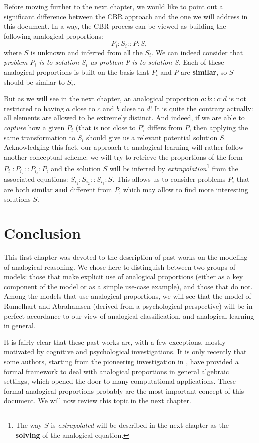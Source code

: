 Before moving further to the next chapter, we would like to point out a
significant difference between the CBR approach and the one we will address in
this document. In a way, the CBR process can be viewed as building the
following analogical proportions:
$$P_i:S_i :: P : S, $$
where $S$ is unknown and inferred from all the $S_i$. We can indeed consider
that \textit{problem $P_i$ is to solution $S_i$ as problem $P$ is to solution
$S$}. Each of these analogical proportions is built on the basis that $P_i$ and
$P$ are \textbf{similar}, so $S$ should be similar to $S_i$.

But as we will see in the next chapter, an analogical proportion $a:b::c:d$ is
not restricted to having $a$ close to $c$ and $b$ close to $d$! It is quite the
contrary actually: all elements are allowed to be extremely distinct. And
indeed, if we are able to \textit{capture} how a given $P_i$ (that is not close
to $P$) differs from $P$, then applying the same transformation to $S_i$ should
give us a relevant potential solution $S$.  Acknowledging this fact, our
approach to analogical learning will rather follow another conceptual
scheme: we will try to retrieve the proportions of the form $P_{i_1} : P_{i_2}
:: P_{i_3} : P$, and the solution $S$ will be inferred by
\textit{extrapolation}\footnote{The way $S$ is \textit{extrapolated} will be
described in the next chapter as the \textbf{solving} of the analogical
equation.} from the associated equations: $S_{i_1} : S_{i_2} :: S_{i_3} :
S$. This allows us to consider problems $P_i$ that are both similar
\textbf{and} different from $P$, which may allow to find more interesting
solutions $S$.

\section*{Conclusion}

This first chapter was devoted to the description of past works on the modeling
of analogical reasoning. We chose here to distinguish between two groups of
models: those that make explicit use of analogical proportions (either as a key
component of the model or as a simple use-case example), and those that do not.
Among the models that use analogical proportions, we will see that the model
of Rumelhart and Abrahamsen (derived from a psychological perspective) will be
in perfect accordance to our view of analogical classification, and analogical
learning in general.

It is fairly clear that these past works are, with a few exceptions, mostly
motivated by cognitive and psychological investigations. It is only recently
that some authors, starting from the pioneering investigation in \cite{Lep04},
have provided a formal framework to deal with analogical proportions in general
algebraic settings, which opened the door to many computational applications.
These formal analogical proportions probably are the most important concept of
this document. We will now review this topic in the next chapter.
